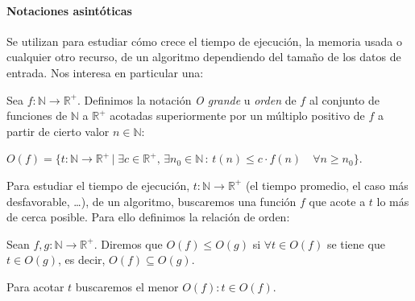 \hfil

\paragraph{Notaciones asintóticas} 

\hfil

Se utilizan para estudiar cómo crece el tiempo de ejecución, la memoria usada o cualquier otro recurso, de un algoritmo dependiendo del tamaño de los datos de entrada. Nos interesa en particular una:

\begin{definition}
	Sea $f : \mathbb{N} \rightarrow \mathbb{R}^+$. Definimos la notación \textit{O grande} u \textit{orden} de $f$ al conjunto de funciones de $\mathbb{N}$ a $\mathbb{R}^+$ acotadas superiormente por un múltiplo positivo de $f$ a partir de cierto valor $n \in \mathbb{N}$:
	
	$O(f) = \{t:\mathbb{N} \rightarrow \mathbb{R}^+ \, | \; \exists c \in \mathbb{R}^+,\, \exists 
	n_0\in \mathbb{N} \, : \, t(n) \leq c\cdot f(n) \quad \forall n \geq n_0  \}$. 
	
\end{definition}

\hfil

Para estudiar el tiempo de ejecución, $t : \mathbb{N} \rightarrow \mathbb{R}^+$ (el tiempo promedio, el caso más desfavorable, \dots), de un algoritmo, buscaremos una función $f$ que acote a $t$ lo más de cerca posible. Para ello definimos la relación de orden:

\begin{definition}
	Sean $f, g : \mathbb{N} \rightarrow \mathbb{R}^+$.
	Diremos que  $O(f) \leq O(g)$ si $\forall t \in O(f)$ se tiene que $t \in O(g)$, es decir,  $O(f) \subseteq O(g)$.
\end{definition}

Para acotar $t$ buscaremos el menor $O(f) : t\in O(f)$.


